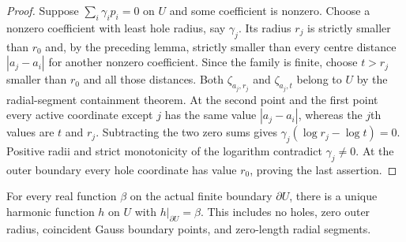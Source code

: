 \begin{proof}
Suppose $\sum_i\gamma_i p_i=0$ on $U$ and some coefficient is nonzero.
Choose a nonzero coefficient with least hole radius, say $\gamma_j$.
Its radius $r_j$ is strictly smaller than $r_0$ and, by the preceding lemma,
strictly smaller than every centre distance $|a_j-a_i|$ for another nonzero
coefficient. Since the family is finite, choose $t>r_j$ smaller than $r_0$
and all those distances. Both $\zeta_{a_j,r_j}$ and $\zeta_{a_j,t}$ belong
to $U$ by the radial-segment containment theorem. At the second point and
the first point every active coordinate except $j$ has the same value
$|a_j-a_i|$, whereas the $j$th values are $t$ and $r_j$. Subtracting the two
zero sums gives $\gamma_j(\log r_j-\log t)=0$. Positive radii and strict
monotonicity of the logarithm contradict $\gamma_j\ne0$.
At the outer boundary every hole coordinate has value $r_0$, proving the
last assertion.
\end{proof}

\begin{theorem}\label{thm:fc-dirichlet-existence}
\leanok
{}
For every real function $\beta$ on the actual finite boundary $\partial U$,
there is a unique harmonic function $h$ on $U$ with $h|_{\partial U}=\beta$.
This includes no holes, zero outer radius, coincident Gauss boundary points,
and zero-length radial segments.
\end{theorem}

